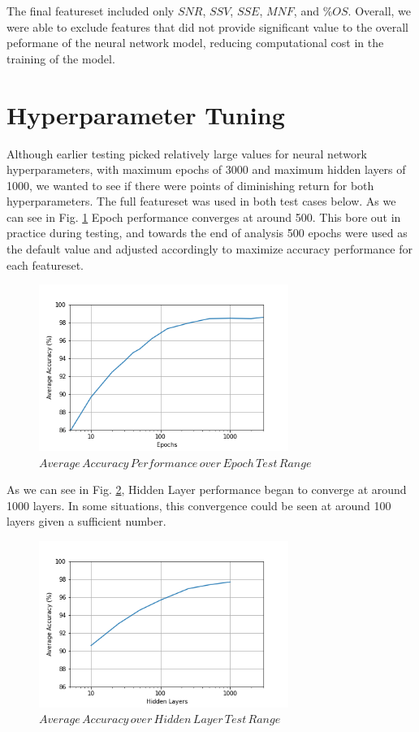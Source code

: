 \documentclass[conference]{IEEEtran}
\begin{document}
The final featureset included only $SNR$, $SSV$, $SSE$, $MNF$, and $\%OS$. Overall, we were able to exclude features that did not provide significant value to the overall peformane of the neural network model, reducing computational cost in the training of the model.



\section{Hyperparameter Tuning}

Although earlier testing picked relatively large values for neural network hyperparameters, with maximum epochs of 3000 and maximum hidden layers of 1000, we wanted to see if there were points of diminishing return for both hyperparameters. The full featureset was used in both test cases below. As we can see in Fig. \ref{fig:EpochPerf} Epoch performance converges at around 500. This bore out in practice during testing, and towards the end of analysis 500 epochs were used as the default value and adjusted accordingly to maximize accuracy performance for each featureset.

\begin{figure}[htb]
\centering
\includegraphics[width=3.2in]{figures/70_aa_vs_epoch.png}
\caption{$Average\,Accuracy\,Performance\,over\,Epoch\,Test\,Range$}
\label{fig:EpochPerf}
\end{figure}

As we can see in Fig. \ref{fig:LayerPerf}, Hidden Layer performance began to converge at around 1000 layers. In some situations, this convergence could be seen at around 100 layers given a sufficient number.

\begin{figure}[htb]
\centering
\includegraphics[width=3.2in]{figures/71_aa_vs_layers.png}
\caption{$Average\,Accuracy\,over\,Hidden\,Layer\,Test\,Range$}
\label{fig:LayerPerf}
\end{figure}
\end{document}

